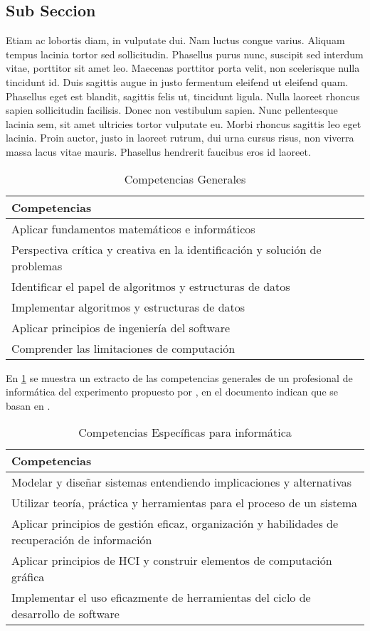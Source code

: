 \subsection{Sub Seccion}


Etiam ac lobortis diam, in vulputate dui. Nam luctus congue varius. Aliquam tempus lacinia tortor sed sollicitudin. Phasellus purus nunc, suscipit sed interdum vitae, porttitor sit amet leo. Maecenas porttitor porta velit, non scelerisque nulla tincidunt id. Duis sagittis augue in justo fermentum eleifend ut eleifend quam. Phasellus eget est blandit, sagittis felis ut, tincidunt ligula. Nulla laoreet rhoncus sapien sollicitudin facilisis. Donec non vestibulum sapien. Nunc pellentesque lacinia sem, sit amet ultricies tortor vulputate eu. Morbi rhoncus sagittis leo eget lacinia. Proin auctor, justo in laoreet rutrum, dui urna cursus risus, non viverra massa lacus vitae mauris. Phasellus hendrerit faucibus eros id laoreet.


\begin{table}[h]
\centering
\caption{Competencias Generales}
\begin{tabular}[t]{l}
\hline
Competencias\\
\hline
Aplicar fundamentos matemáticos e informáticos\\
Perspectiva crítica y creativa en la identificación y solución de problemas\\
Identificar el papel de algoritmos y estructuras de datos\\
Implementar algoritmos y estructuras de datos\\
Aplicar principios de ingeniería del software\\
Comprender las limitaciones de computación\\
\hline
\end{tabular}
\label{tab:compgen1}
\end{table}

En  \ref{tab:compgen1} se muestra un extracto de las competencias generales de un profesional de informática del experimento propuesto por \citep{Ramos2013}, en el documento indican que se basan en \citep{acm2005r}.


\begin{table}[h]
\centering
\caption{Competencias Específicas para informática}
\begin{tabular}[t]{|p{12cm}|}
\hline
Competencias\\
\hline
Modelar y diseñar sistemas entendiendo implicaciones y alternativas\\
Utilizar teoría, práctica y herramientas para el proceso de un sistema\\
Aplicar principios de gestión eficaz, organización y habilidades de recuperación de información\\
Aplicar principios de HCI y construir elementos de computación gráfica\\
Implementar el uso eficazmente de herramientas del ciclo de desarrollo de software \\
\hline
\end{tabular}
\label{tab:compgen2}
\end{table}


